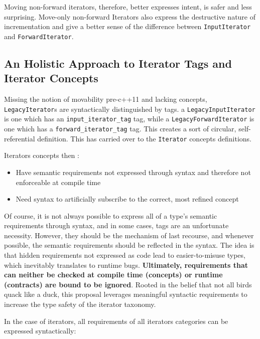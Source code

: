 \documentclass{wg21}
\begin{document}
Moving non-forward iterators, therefore, better expresses intent, is
safer and less surprising. Move-only non-forward Iterators also express
the destructive nature of incrementation and give a better sense of the
difference between \texttt{InputIterator} and \texttt{ForwardIterator}.

\hypertarget{an-holistic-approach-to-iterator-tags-and-iterator-concepts}{%
	\subsection{An Holistic Approach to Iterator Tags and Iterator
		Concepts}\label{an-holistic-approach-to-iterator-tags-and-iterator-concepts}}

Missing the notion of movability pre-c++11 and lacking concepts,
\texttt{LegacyIterator}s are syntactically distinguished by tags. a
\texttt{LegacyInputIterator} is one which has an
\texttt{input\_iterator\_tag} tag, while a
\texttt{LegacyForwardIterator} is one which has a
\texttt{forward\_iterator\_tag} tag. This creates a sort of circular,
self-referential definition. This has carried over to the \texttt{Iterator} concepts definitions. 

Iterators concepts then :

\begin{itemize}
	\item Have semantic requirements not expressed through syntax and therefore not enforceable at compile time
	\item Need syntax to artificially subscribe to the correct, most refined concept
\end{itemize}


Of course, it is not always possible to express all of a type's semantic
requirements through syntax, and in some cases, tags are an unfortunate
necessity. However, they should be the mechanism of last recourse, and
whenever possible, the semantic requirements should be reflected in the
syntax. The idea is that hidden requirements not expressed as code lead
to easier-to-misuse types, which inevitably translates to runtime bugs.
\textbf{Ultimately, requirements that can neither be checked at compile
	time (concepts) or runtime (contracts) are bound to be ignored}. Rooted
in the belief that not all birds quack like a duck, this proposal
leverages meaningful syntactic requirements to increase the type safety
of the iterator taxonomy.

In the case of iterators, all requirements of all iterators categories
can be expressed syntactically:
\end{document}
